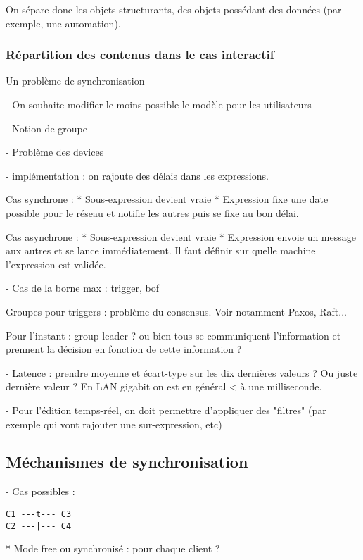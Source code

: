 \documentclass{article}
\begin{document}
On sépare donc les objets structurants, des objets possédant des données (par exemple, une automation).


\subsubsection{Répartition des contenus dans le cas interactif}
\begin{figure}[h]
    \centering
    \begin{tikzpicture}
    
    \end{tikzpicture}
    \label{scenar.general}
\end{figure}

Un problème de synchronisation

- On souhaite modifier le moins possible le modèle pour les utilisateurs

- Notion de groupe

- Problème des devices

- implémentation : on rajoute des délais dans les expressions.

Cas synchrone : 
* Sous-expression devient vraie
* Expression fixe une date possible pour le réseau et notifie les autres puis se fixe au bon délai.

Cas asynchrone : 
* Sous-expression devient vraie
* Expression envoie un message aux autres et se lance immédiatement.
Il faut définir sur quelle machine l'expression est validée.

- Cas de la borne max : trigger, bof

Groupes pour triggers : problème du consensus. Voir notamment Paxos, Raft... 

Pour l'instant : group leader ? ou bien tous se communiquent l'information et prennent la décision en fonction de cette information ?

- Latence : prendre moyenne et écart-type sur les dix dernières valeurs ? Ou juste dernière valeur ?
En LAN gigabit on est en général < à une milliseconde.

- Pour l'édition temps-réel, on doit permettre d'appliquer des "filtres" (par exemple qui vont rajouter une sur-expression, etc)
\subsection{Méchanismes de synchronisation}
- Cas possibles : 

\begin{lstlisting}
C1 ---t--- C3
C2 ---|--- C4
\end{lstlisting}
* Mode free ou synchronisé : pour chaque client ? 
\end{document}
